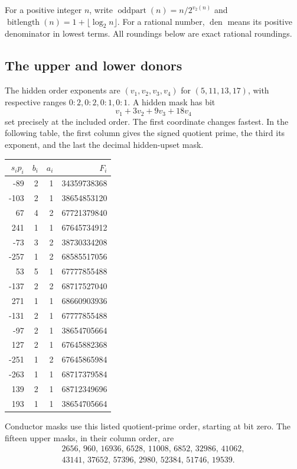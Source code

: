 \documentclass[11pt]{article}
\numberwithin{equation}{section}
\theoremstyle{definition}
\theoremstyle{remark}
\begin{document}
For a positive integer $n$, write $\operatorname{oddpart}(n)=n/2^{v_2(n)}$
and $\operatorname{bitlength}(n)=1+\lfloor\log_2n\rfloor$.
For a rational number, $\operatorname{den}$ means its positive denominator
in lowest terms. All roundings below are exact rational roundings.

\subsection{The upper and lower donors}
The hidden order exponents are $(v_1,v_2,v_3,v_4)$ for
$(5,11,13,17)$, with respective ranges $0\!:\!2,0\!:\!2,0\!:\!1,0\!:\!1$.
A hidden mask has bit
\[
 v_1+3v_2+9v_3+18v_4
\]
set precisely at the included order. The first coordinate changes fastest.
In the following table, the first column gives the signed quotient prime,
the third its exponent, and the last the decimal hidden-upset mask.
\begin{center}\small
\begin{tabular}{rrrr}\toprule
$s_ip_i$ & $b_i$ & $a_i$ & $F_i$\\\midrule
-89 & 2 & 1 & 34359738368\\
-103 & 2 & 1 & 38654853120\\
67 & 4 & 2 & 67721379840\\
241 & 1 & 1 & 67645734912\\
-73 & 3 & 2 & 38730334208\\
-257 & 1 & 2 & 68585517056\\
53 & 5 & 1 & 67777855488\\
-137 & 2 & 2 & 68717527040\\
271 & 1 & 1 & 68660903936\\
-131 & 2 & 1 & 67777855488\\
-97 & 2 & 1 & 38654705664\\
127 & 2 & 1 & 67645882368\\
-251 & 1 & 2 & 67645865984\\
-263 & 1 & 1 & 68717379584\\
139 & 2 & 1 & 68712349696\\
193 & 1 & 1 & 38654705664\\
\bottomrule\end{tabular}\end{center}
Conductor masks use this listed quotient-prime order, starting at bit zero.
The fifteen upper masks, in their column order, are
\[
\begin{gathered}
2656,\,960,\,16936,\,6528,\,11008,\,6852,\,32986,\,41062,\\
43141,\,37652,\,57396,\,2980,\,52384,\,51746,\,19539. 
\end{gathered}
\]
\end{document}
